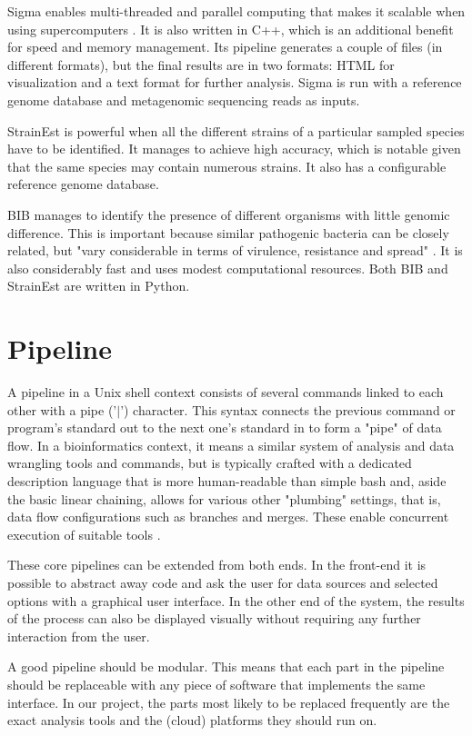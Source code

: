 \documentclass{article}
\begin{document}
Sigma enables multi-threaded and parallel computing that makes it scalable when using supercomputers \cite{ahn2015sigma}. It is also written in C++, which is an additional benefit for speed and memory management. Its pipeline generates a couple of files (in different formats), but the final results are in two formats: HTML for visualization and a text format for further analysis. Sigma is run with a reference genome database and metagenomic sequencing reads as inputs. 

StrainEst is powerful when all the different strains of a particular sampled species have to be identified. It manages to achieve high accuracy, which is notable given that the same species may contain numerous strains. It also has a configurable reference genome database. 

BIB manages to identify the presence of different organisms with little genomic difference. This is important because similar pathogenic bacteria can be closely related, but "vary considerable in terms of virulence, resistance and spread" \cite{mbs:/content/journal/mgen/10.1099/mgen.0.000075}. It is also considerably fast and uses modest computational resources. Both BIB and StrainEst are written in Python. 


\section {Pipeline}
A pipeline in a Unix shell context consists of several commands linked to each other with a pipe ('$|$') character. This syntax connects the previous command or program's standard out to the next one's standard in to form a "pipe" of data flow. In a bioinformatics context, it means a similar system of analysis and data wrangling tools and commands, but is typically crafted with a dedicated description language that is more human-readable than simple bash and, aside the basic linear chaining, allows for various other "plumbing" settings, that is, data flow configurations such as branches and merges. These enable concurrent execution of suitable tools \cite{wdl}.

These core pipelines can be extended from both ends. In the front-end it is possible to abstract away code and ask the user for data sources and selected options with a graphical user interface. In the other end of the system, the results of the process can also be displayed visually without requiring any further interaction from the user.

A good pipeline should be modular. This means that each part in the pipeline should be replaceable with any piece of software that implements the same interface. In our project, the parts most likely to be replaced frequently are the exact analysis tools and the (cloud) platforms they should run on.
\end{document}
